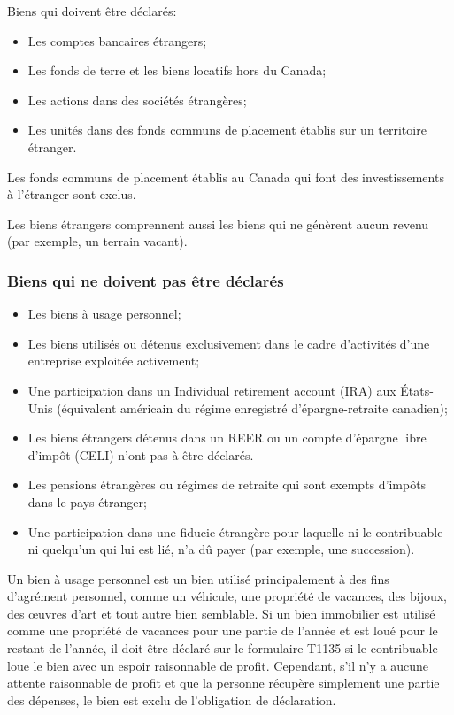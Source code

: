 Biens qui doivent être déclarés:
\begin{itemize}
	\item Les comptes bancaires étrangers;
	\item Les fonds de terre et les biens locatifs hors du Canada;
	\item Les actions dans des sociétés étrangères;
	\item Les unités dans des fonds communs de placement établis sur un territoire étranger.
\end{itemize}

Les fonds communs de placement établis au Canada qui font des investissements à l'étranger sont exclus.

\begin{note}
	Les biens étrangers comprennent aussi les biens qui ne génèrent aucun revenu (par exemple, un terrain vacant).
\end{note}

\subsubsection{Biens qui ne doivent pas être déclarés}
\begin{itemize}
	\item Les biens à usage personnel;
	\item Les biens utilisés ou détenus exclusivement dans le cadre d'activités d'une entreprise exploitée activement;
	\item Une participation dans un \og Individual retirement account (IRA)\fg{} aux États-Unis (équivalent américain du régime enregistré d'épargne-retraite canadien);
	\item Les biens étrangers détenus dans un REER ou un compte d'épargne libre d'impôt (CELI) n'ont pas à être déclarés.
	\item Les pensions étrangères ou régimes de retraite qui sont exempts d'impôts dans le pays étranger;
	\item Une participation dans une fiducie étrangère pour laquelle ni le contribuable ni quelqu'un qui lui est lié, n'a dû payer (par exemple, une succession).
\end{itemize}

Un bien à usage personnel est un bien utilisé principalement à des fins d'agrément personnel, comme un véhicule, une propriété de vacances, des bijoux, des œuvres d'art et tout autre bien semblable. Si un bien immobilier est utilisé comme une propriété de vacances pour une partie de l'année et est loué pour le restant de l'année, il doit être déclaré sur le formulaire T1135 si le contribuable loue le bien avec un espoir raisonnable de profit. Cependant, s'il n'y a aucune attente raisonnable de profit et que la personne récupère simplement une partie des dépenses, le bien est exclu de l'obligation de déclaration.

